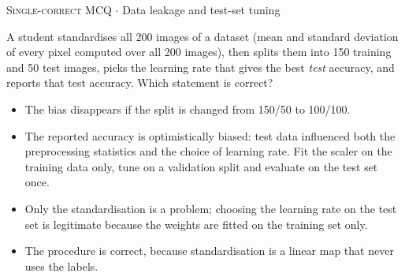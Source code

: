 \documentclass[11pt,a4paper]{article}
\newcommand{\optlabel}[1]{\textbf{(#1)}}
\newcommand{\correctlabel}[1]{\textcolor{okgreen}{\textbf{(#1)}\,\ding{51}}}
\newenvironment{qitem}[1]{\begin{list}{}{\setlength{\leftmargin}{3.3em}\setlength{\labelwidth}{3.1em}%
  \setlength{\labelsep}{0.2em}\setlength{\topsep}{3pt}\setlength{\parsep}{3pt}}\item[\textbf{Q.#1}\hfill]}{\end{list}}
\newcommand{\qmeta}[2]{{\footnotesize\color{black!60}\textsc{#1} \;$\cdot$\; #2}\par}
\begin{document}
\begin{qitem}{12}
\qmeta{Single-correct MCQ}{Data leakage and test-set tuning}
A student standardises all 200 images of a dataset (mean and standard deviation of every pixel computed over all
200 images), then splits them into 150 training and 50 test images, picks the learning rate that gives the best
\emph{test} accuracy, and reports that test accuracy. Which statement is correct?
\begin{itemize}[leftmargin=2.6em, labelsep=0.4em, itemsep=2pt, topsep=3pt]
\item[\optlabel{A}] The bias disappears if the split is changed from 150/50 to 100/100.
\item[\correctlabel{B}] The reported accuracy is optimistically biased: test data influenced both the preprocessing statistics and the choice of learning rate. Fit the scaler on the training data only, tune on a validation split and evaluate on the test set once.
\item[\optlabel{C}] Only the standardisation is a problem; choosing the learning rate on the test set is legitimate because the weights are fitted on the training set only.
\item[\optlabel{D}] The procedure is correct, because standardisation is a linear map that never uses the labels.
\end{itemize}
\end{qitem}
\end{document}
